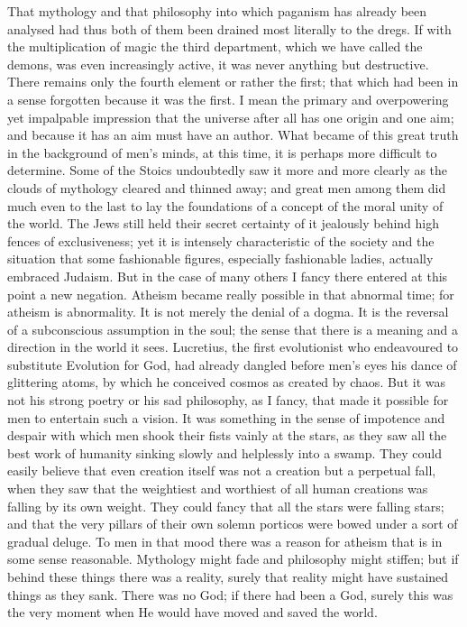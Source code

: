 That mythology and that philosophy into which paganism has already been analysed had thus both of them been drained most literally to the dregs. If with the multiplication of magic the third department, which we have called the demons, was even increasingly active, it was never anything but destructive. There remains only the fourth element or rather the first; that which had been in a sense forgotten because it was the first. I mean the primary and overpowering yet impalpable impression that the universe after all has one origin and one aim; and because it has an aim must have an author. What became of this great truth in the background of men's minds, at this time, it is perhaps more difficult to determine. Some of the Stoics undoubtedly saw it more and more clearly as the clouds of mythology cleared and thinned away; and great men among them did much even to the last to lay the foundations of a concept of the moral unity of the world. The Jews still held their secret certainty of it jealously behind high fences of exclusiveness; yet it is intensely characteristic of the society and the situation that some fashionable figures, especially fashionable ladies, actually embraced Judaism. But in the case of many others I fancy there entered at this point a new negation. Atheism became really possible in that abnormal time; for atheism is abnormality. It is not merely the denial of a dogma. It is the reversal of a subconscious assumption in the soul; the sense that there is a meaning and a direction in the world it sees. Lucretius, the first evolutionist who endeavoured to substitute Evolution for God, had already dangled before men's eyes his dance of glittering atoms, by which he conceived cosmos as created by chaos. But it was not his strong poetry or his sad philosophy, as I fancy, that made it possible for men to entertain such a vision. It was something in the sense of impotence and despair with which men shook their fists vainly at the stars, as they saw all the best work of humanity sinking slowly and helplessly into a swamp. They could easily believe that even creation itself was not a creation but a perpetual fall, when they saw that the weightiest and worthiest of all human creations was falling by its own weight. They could fancy that all the stars were falling stars; and that the very pillars of their own solemn porticos were bowed under a sort of gradual deluge. To men in that mood there was a reason for atheism that is in some sense reasonable. Mythology might fade and philosophy might stiffen; but if behind these things there was a reality, surely that reality might have sustained things as they sank. There was no God; if there had been a God, surely this was the very moment when He would have moved and saved the world.

